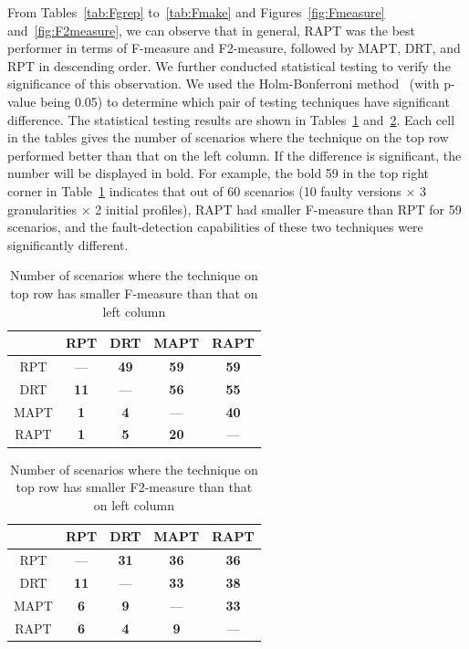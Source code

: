 \documentclass[10pt,journal,compsoc]{IEEEtran}
\begin{document}
From Tables~\ref{tab:Fgrep} to~\ref{tab:Fmake} and Figures~\ref{fig:Fmeasure} and~\ref{fig:F2measure}, we can observe that in general, RAPT was the best performer in terms of F-measure and F2-measure, followed by MAPT, DRT, and RPT in descending order. We further conducted statistical testing to verify the significance of this observation. We used the Holm-Bonferroni method~\cite{Holm79} (with p-value being 0.05) to determine which pair of testing techniques have significant difference. The statistical testing results are shown in Tables~\ref{tab:Fsta} and~\ref{tab:F2sta}. Each cell in the tables gives the number of scenarios where the technique on the top row performed better than that on the left column. If the difference is significant, the number will be displayed in bold. For example, the bold 59 in the top right corner in Table~\ref{tab:Fsta} indicates that out of 60 scenarios (10 faulty versions $\times$ 3 granularities $\times$ 2 initial profiles), RAPT had smaller F-measure than RPT for 59 scenarios, and the fault-detection capabilities of these two techniques were significantly different.

\begin{table}
\caption{Number of scenarios where the technique on top row has smaller F-measure than that on left column}
\label{tab:Fsta}
\centering
\begin{tabular}{|c|c|c|c|c|} \hline
			& RPT					& DRT					& MAPT				& RAPT				\\ \hline
RPT		& ---					& \textbf{49}	& \textbf{59}	& \textbf{59}	\\ \hline
DRT		& \textbf{11}	& ---					& \textbf{56}	& \textbf{55}	\\ \hline
MAPT	& \textbf{1}	& \textbf{4}	& ---					& \textbf{40}	\\ \hline
RAPT	& \textbf{1}	& \textbf{5}	& \textbf{20}	& ---					\\ \hline
\end{tabular}
\end{table}

\begin{table}
\caption{Number of scenarios where the technique on top row has smaller F2-measure than that on left column}
\label{tab:F2sta}
\centering
\begin{tabular}{|c|c|c|c|c|} \hline
			& RPT					& DRT					& MAPT				& RAPT				\\ \hline
RPT		& ---					& \textbf{31}	& \textbf{36}	& \textbf{36}	\\ \hline
DRT		& \textbf{11}	& ---					& \textbf{33}	& \textbf{38}	\\ \hline
MAPT	& \textbf{6}	& \textbf{9}	& ---					& \textbf{33}	\\ \hline
RAPT	& \textbf{6}	& \textbf{4}	& \textbf{9}	& ---					\\ \hline
\end{tabular}
\end{table}
\end{document}
